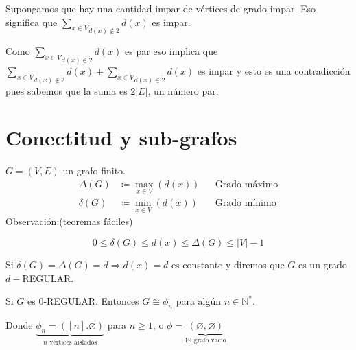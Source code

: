 \documentclass[../main.tex]{subfiles}
\begin{document}
Supongamos que hay una cantidad impar de vértices de grado impar.
Eso significa que
\(
	\underset
	{
		d(x)\notin\dot{2}
	}
	{
		\sum_{x\in V}
	}d(x)
\)
es impar.

Como
\(
	\underset
	{
		d(x)\in\dot{2}
	}
	{
		\sum_{x\in V}
	}d(x)
\)
es par eso implica que
\(
	\underset
	{
		d(x)\notin\dot{2}
	}
	{
		\sum_{x\in V}
	}d(x)
	+
	\underset
	{
		d(x)\in\dot{2}
	}
	{
		\sum_{x\in V}
	}d(x)
\)
es impar y esto es una contradicción pues sabemos que la suma es $2|E|$,
un número par.

\section{Conectitud y sub-grafos}%
\label{sec:conectitud_y_sub_grafos}

$G=(V,E)$ un grafo finito.
\begin{align*}
	\Delta(G)&\coloneqq\max_{x\in V}(d(x)) && \text{Grado máximo}\\
	\delta(G)&\coloneqq \min_{x\in V}(d(x)) && \text{Grado mínimo}
\end{align*}
Observación:(teoremas fáciles)

\[
	0\leq \delta(G) \leq d(x) \leq \Delta(G) \leq |V| - 1
\]

Si $\delta(G)=\Delta(G)=d\Longrightarrow d(x)=d$ es constante
y diremos que $G$ es un grado $d-$REGULAR.

Si $G$ es 0-REGULAR.
Entonces $G\cong \phi_n$ para algún $n\in \mathbb{N}^*$.

Donde
\(
	\underbrace
	{
		\phi_n=([n].\varnothing)
	}_
	{
		n\text{ vértices aislados}
	}
\)
para $n\geq 1$,
o
\(
	\phi =
	\underbrace
	{
		(\varnothing,\varnothing)
	}_
	{
		\text{El grafo vacío}
	}
\)

\begin{figure}[H]
	\centering
	
\end{figure}
\end{document}
